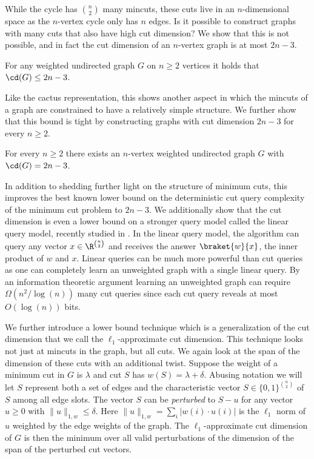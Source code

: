 While the cycle has $\binom{n}{2}$ many mincuts, these cuts live in an $n$-dimensional space as the $n$-vertex cycle only has $n$ edges.  Is it possible to construct graphs
with many cuts that also have high cut dimension?  We show that this is not possible, and in fact the cut dimension of an $n$-vertex graph is at most $2n-3$.
\begin{theorem}
\label{thm:cd_upper}
For any weighted undirected graph $G$ on $n\ge 2$ vertices it holds that $\cd(G) \le 2n-3$.
\end{theorem}
Like the cactus representation, this shows another aspect in which the mincuts of a graph are constrained to have a relatively simple structure.  We further show that this bound is
tight by constructing graphs with cut dimension $2n-3$ for every $n \ge 2$.
\begin{theorem}
\label{thm:cd_lower}
For every $n \ge 2$ there exists an $n$-vertex weighted undirected graph $G$ with $\cd(G) = 2n-3$.
\end{theorem}



In addition to shedding further light on the structure of minimum cuts, this improves the best known lower bound on the deterministic cut query complexity of
the minimum cut problem to $2n-3$.  We additionally show that the cut dimension is even a lower bound on a stronger query model called the linear query model, recently
studied in \cite{ACK20}.  In the linear query model, the algorithm can query any vector $x \in \R^{\binom{n}{2}}$ and receives the answer $\braket{w}{x}$, the
inner product of $w$ and $x$.  Linear queries can be much more powerful than cut queries as one can completely learn an unweighted graph with a single linear query.
By an information theoretic argument learning an unweighted graph can require $\Omega(n^2/\log(n))$ many cut queries since each cut query reveals at most
$O(\log (n))$ bits.

We further introduce a lower bound technique which is a generalization of the cut dimension that we call the $\ell_1$-approximate cut dimension.  This technique
looks not just at mincuts in the graph, but all cuts.  We again look at the span of the dimension of these cuts with
an additional twist.  Suppose the weight of a minimum cut in $G$ is $\lambda$ and cut $S$ has $w(S) = \lambda + \delta$.  Abusing notation we will let $S$
represent both a set of edges and the characteristic vector $S \in \{0,1\}^{\binom{n}{2}}$ of $S$ among all edge slots.
The vector $S$ can be \emph{perturbed} to $S - u$ for
any vector $u \ge 0$ with $\|u\|_{1,w} \le \delta$.  Here $\| u \|_{1,w} = \sum_i |w(i) \cdot u(i)|$ is the $\ell_1$ norm of $u$ weighted by the edge weights of
the graph.  The $\ell_1$-approximate cut dimension of $G$ is then the minimum over all valid perturbations of the dimension of the span of the perturbed cut vectors.

